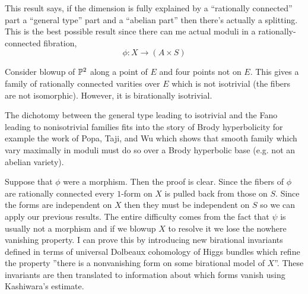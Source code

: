 \documentclass[12pt]{article}
\begin{document}
\begin{rmk}
This result says, if the dimension is fully explained by a ``rationally connected'' part a ``general type'' part and a ``abelian part'' then there's actually a splitting. This is the best possible result since there can me actual moduli in a rationally-connected fibration,
\[ \phi : X \to (A \times S) \]
\end{rmk}

\begin{example}
Consider blowup of $\P^2$ along a point of $E$ and four points not on $E$. This gives a family of rationally connected varities over $E$ which is not isotrivial (the fibers are not isomorphic). However, it is birationally isotrivial.
\end{example}


The dichotomy between the general type leading to isotrivial and the Fano leading to nonisotrivial families fits into the story of Brody hyperbolicity for example the work of Popa, Taji, and Wu which shows that smooth family which vary maximally in moduli must do so over a Brody hyperbolic base (e.g. not an abelian variety). 


\begin{rmk}
Suppose that $\phi$ were a morphism. Then the proof is clear. Since the fibers of $\phi$ are rationally connected every $1$-form on $X$ is pulled back from those on $S$. Since the forms are independent on $X$ then they must be independent on $S$ so we can apply our previous results. The entire difficulty comes from the fact that $\psi$ is usually not a morphism and if we blowup $X$ to resolve it we lose the nowhere vanishing property. I can prove this by introducing new birational invariants defined in terms of universal Dolbeaux cohomology of Higgs bundles which refine the property ''there is a nonvanishing form on some birational model of $X$''. These invariants are then translated to information about which forms vanish using Kashiwara's estimate.
\end{rmk}
\end{document}

